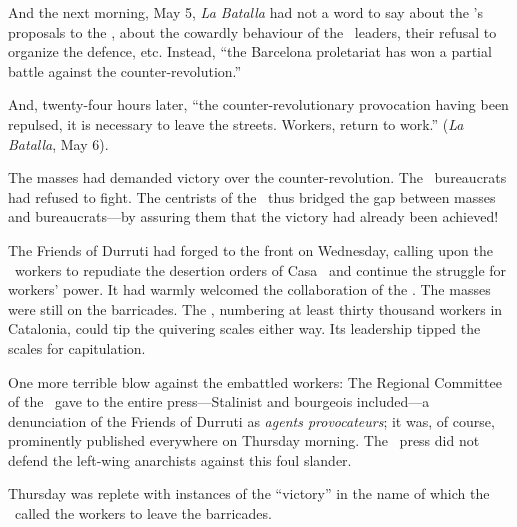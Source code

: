 And the next morning, May 5, \emph{La Batalla} had not a word to say about the \POUM’s proposals to the \CNT, about the cowardly behaviour of the \CNT\ leaders, their refusal to organize the defence, etc. Instead, ``the Barcelona proletariat has won a partial battle against the counter-revolution.''

And, twenty-four hours later, ``the counter-revolutionary provocation having been repulsed, it is necessary to leave the streets. Workers, return to work.'' (\emph{La Batalla}, May 6).

The masses had demanded victory over the counter-revolution. The \CNT\ bureaucrats had refused to fight. The centrists of the \POUM\ thus bridged the gap between masses and bureaucrats---by assuring them that the victory had already been achieved!

The Friends of Durruti had forged to the front on Wednesday, calling upon the \CNT\ workers to repudiate the desertion orders of Casa \CNT\ and continue the struggle for workers’ power. It had warmly welcomed the collaboration of the \POUM. The masses were still on the barricades. The \POUM, numbering at least thirty thousand workers in Catalonia, could tip the quivering scales either way. Its leadership tipped the scales for capitulation.

One more terrible blow against the embattled workers: The Regional Committee of the \CNT\ gave to the entire press---Stalinist and bourgeois included---a denunciation of the Friends of Durruti as \emph{agents provocateurs}; it was, of course, prominently published everywhere on Thursday morning. The \POUM\ press did not defend the left-wing anarchists against this foul slander.

\dinkus

Thursday was replete with instances of the ``victory'' in the name of which the \POUM\ called the workers to leave the barricades.

